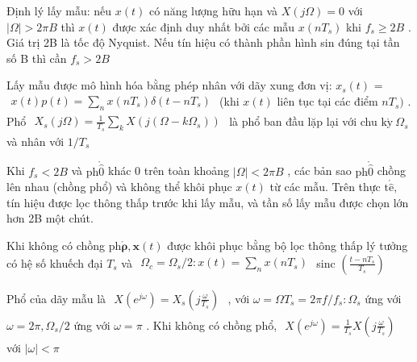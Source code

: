 \documentclass[
  10
]{article}
\begin{document}
Định lý lấy mẫu: nếu \(x ( t )\) có năng lượng hữu hạn và
\(X ( j \Omega ) = 0\) với \(| \Omega | > 2 \pi B\) thì \(x ( t )\) được
xác định duy nhất bởi các mẫu \(x ( n T _ { s } )\) khi
\(f _ { s } \geq 2 B\) . Giá trị 2B là tốc độ Nyquist. Nếu tín hiệu có
thành phần hình sin đúng tại tần số B thì cần \(f _ { s } > 2 B\)

Lấy mẫu được mô hình hóa bằng phép nhân với dãy xung đơn vị:
\(x _ { s } ( t )\) =
\(\begin{array} { r } { x ( t ) p ( t ) = \sum _ { n } x ( n T _ { s } ) \delta ( t - n T _ { s } ) } \end{array}\)
(khi \(x ( t )\) liên tục tại các điểm \(n T _ { s } )\) . Phổ
\(\begin{array} { r } { X _ { s } ( j \Omega ) = \frac { 1 } { T _ { s } } \sum _ { k } X ( j ( \Omega - k \Omega _ { s } ) ) } \end{array}\)
là phổ ban đầu lặp lại với chu
\(\mathrm { k } \mathring { \mathrm { y } } \ \Omega _ { s }\) và nhân
với \(1 / T _ { s }\)

Khi \(f _ { s } < 2 B\) và \(\mathrm { p h } \mathring { \hat { 0 } }\)
khác 0 trên toàn khoảng \(| \Omega | < 2 \pi B\) , các bản sao
\(\mathrm { p h } \mathring { \hat { 0 } }\) chồng lên nhau (chồng phổ)
và không thể khôi phục \(x ( t )\) từ các mẫu. Trên thực
\(\mathrm { t } \acute { \hat { \mathrm { e } } } ,\) tín hiệu được lọc
thông thấp trước khi lấy mẫu, và tần số lấy mẫu được chọn lớn hơn 2B một
chút.

Khi không có chồng
\(\mathrm { p h } \mathring { \boldsymbol { \rho } } , \boldsymbol { x } ( t )\)
được khôi phục bằng bộ lọc thông thấp lý tưởng có hệ số khuếch đại
\(T _ { s }\) và
\(\begin{array} { r } { \Omega _ { c } = \Omega _ { s } / 2 \colon x ( t ) = \sum _ { n } x ( n T _ { s } ) } \end{array}\)
sinc
\(\scriptstyle \left( { \frac { t - n T _ { s } } { T _ { s } } } \right)\)

Phổ của dãy mẫu là
\(\begin{array} { r } { X ( e ^ { j \omega } ) = X _ { s } \left( j \frac { \omega } { T _ { s } } \right) } \end{array}\)
, với
\(\omega = \Omega T _ { s } = 2 \pi f / f _ { s } \colon \Omega _ { s }\)
ứng với \(\omega = 2 \pi , \Omega _ { s } / 2\) ứng với \(\omega = \pi\)
. Khi không có chồng phổ,
\(\begin{array} { r } { X ( e ^ { j \omega } ) = \frac { 1 } { T _ { s } } X \left( j \frac { \omega } { T _ { s } } \right) } \end{array}\)
với \(| \omega | < \pi\)
\end{document}
